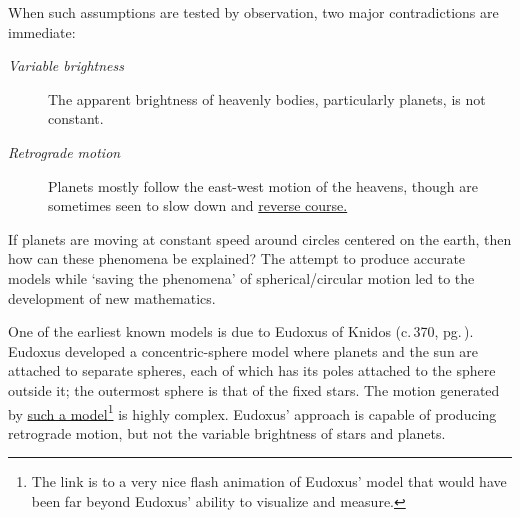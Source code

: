 When such assumptions are tested by observation, two major contradictions are immediate:
\begin{description}
  \item[\normalfont\emph{Variable brightness}] The apparent brightness of heavenly bodies, particularly planets, is not constant.
  \item[\normalfont\emph{Retrograde motion}] Planets mostly follow the east-west motion of the heavens, though are sometimes seen to slow down and \href{http://math.uci.edu/~ndonalds/math184/retrograde.html}{reverse course.}
\end{description}

If planets are moving at constant speed around circles centered on the earth, then how can these phenomena be explained? The attempt to produce accurate models while `saving the phenomena' of spherical/circular motion led to the development of new mathematics.\medbreak

One of the earliest known models is due to Eudoxus of Knidos (c.\,370\BC, pg.\,\pageref{pg:eudoxus}). Eudoxus developed a concentric-sphere model where planets and the sun are attached to separate spheres, each of which has its poles attached to the sphere outside it; the outermost sphere is that of the fixed stars. The motion generated by \href{http://web.calstatela.edu/faculty/hmendel/Ancient Mathematics/Eudoxus/Astronomy/EudoxusHomocentricSpheres.htm}{such a model}\footnote{The link is to a very nice flash animation of Eudoxus' model that would have been far beyond Eudoxus' ability to visualize and measure.} is highly complex. Eudoxus' approach is capable of producing retrograde motion, but not the variable brightness of stars and planets.
\goodbreak




